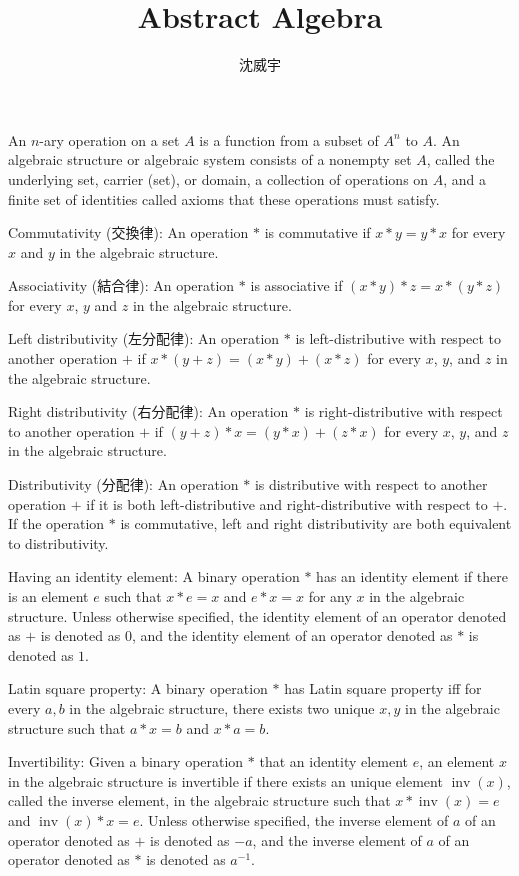 \documentclass[a4paper,12pt]{article}
\begin{document}
\title{Abstract Algebra}
\author{沈威宇}
\date{\temtoday}
\titletocdoc
{}
An $n$-ary operation on a set $A$ is a function from a subset of $A^n$ to $A$.
An algebraic structure or algebraic system consists of a nonempty set $A$, called the underlying set, carrier (set), or domain, a collection of operations on $A$, and a finite set of identities called axioms that these operations must satisfy.
\bit
\item Commutativity (交換律): An operation $*$ is commutative if $x*y=y*x$ for every $x$ and $y$ in the algebraic structure.
\item Associativity (結合律): An operation $*$ is associative if $(x*y)*z=x*(y*z)$ for every $x$, $y$ and $z$ in the algebraic structure.
\item Left distributivity (左分配律): An operation $*$ is left-distributive with respect to another operation $+$ if $x*(y+z)=(x*y)+(x*z)$ for every $x$, $y$, and $z$ in the algebraic structure.
\item Right distributivity (右分配律): An operation $*$ is right-distributive with respect to another operation $+$ if $(y+z)*x=(y*x)+(z*x)$ for every $x$, $y$, and $z$ in the algebraic structure.
\item Distributivity (分配律): An operation $*$ is distributive with respect to another operation $+$ if it is both left-distributive and right-distributive with respect to $+$. If the operation $*$ is commutative, left and right distributivity are both equivalent to distributivity.
\eit
{}
\bit
\item Having an identity element: A binary operation $*$ has an identity element if there is an element $e$ such that $x*e=x$ and $e*x=x$ for any $x$ in the algebraic structure. Unless otherwise specified, the identity element of an operator denoted as $+$ is denoted as $0$, and the identity element of an operator denoted as $*$ is denoted as $1$.
\item Latin square property: A binary operation $*$ has Latin square property iff for every $a,b$ in the algebraic structure, there exists two unique $x,y$ in the algebraic structure such that $a*x=b$ and $x*a=b$.
\item Invertibility: Given a binary operation $*$ that an identity element $e$, an element $x$ in the algebraic structure is invertible if there exists an unique element $\operatorname{inv}(x)$, called the inverse element, in the algebraic structure such that $x*\operatorname{inv}(x)=e$ and $\operatorname{inv}(x)*x=e$. Unless otherwise specified, the inverse element of $a$ of an operator denoted as $+$ is denoted as $-a$, and the inverse element of $a$ of an operator denoted as $*$ is denoted as $a^{-1}$.
\end{document}
